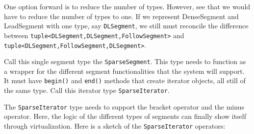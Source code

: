 One option forward is to reduce the number of types. 
However, see that we would have to reduce the number of types to one.
If we represent DenseSegment and LeadSegment with one type, say \verb.DLSegment., we still must reconcile the difference between \verb.tuple<DLSegment,DLSegment,FollowSegment>. and \verb.tuple<DLSegment,FollowSegment,DLSegment>..

Call this single segment type the \verb.SparseSegment..
This type needs to function as a wrapper for the different segment functionalities that the system will support.
It must have \verb.begin(). and \verb.end(). methods that create iterator objects, all still of the same type.
Call this iterator type  \verb.SparseIterator..

The \verb.SparseIterator. type needs to support the bracket operator and the minus operator. 
Here, the logic of the different types of segments can finally show itself through virtualization.
Here is a sketch of the \verb.SparseIterator. operators:
